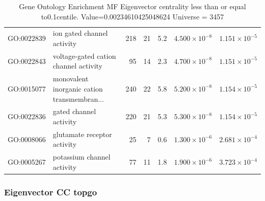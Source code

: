 \begin{table}[ht]
\begin{tabular}{llrrrrr}
  GO:0022839 & ion gated channel activity & 218 & 21 & 5.2 & $4.500 \times 10^{-8}$ & $1.151 \times 10^{-5}$ \\ 
  GO:0022843 & voltage-gated cation channel activity & 95 & 14 & 2.3 & $4.700 \times 10^{-8}$ & $1.151 \times 10^{-5}$ \\ 
  GO:0015077 & monovalent inorganic cation transmembran... & 240 & 22 & 5.8 & $5.200 \times 10^{-8}$ & $1.154 \times 10^{-5}$ \\ 
  GO:0022836 & gated channel activity & 220 & 21 & 5.3 & $5.300 \times 10^{-8}$ & $1.154 \times 10^{-5}$ \\ 
  GO:0008066 & glutamate receptor activity & 25 & 7 & 0.6 & $1.300 \times 10^{-6}$ & $2.681 \times 10^{-4}$ \\ 
  GO:0005267 & potassium channel activity & 77 & 11 & 1.8 & $1.900 \times 10^{-6}$ & $3.723 \times 10^{-4}$ \\ 
   \hline
\end{tabular}
\caption{Gene Ontology Enrichment MF Eigenvector centrality  less than or equal to0.1centile.   Value=0.00234610425048624 Universe = 3457} 
\label{tab:Gene Ontology Enrichment MF Eigenvector centrality  less than or equal to0.1centile.   Value=0.00234610425048624 Universe = 3457}
\end{table}

\subsubsection{Eigenvector CC topgo}

